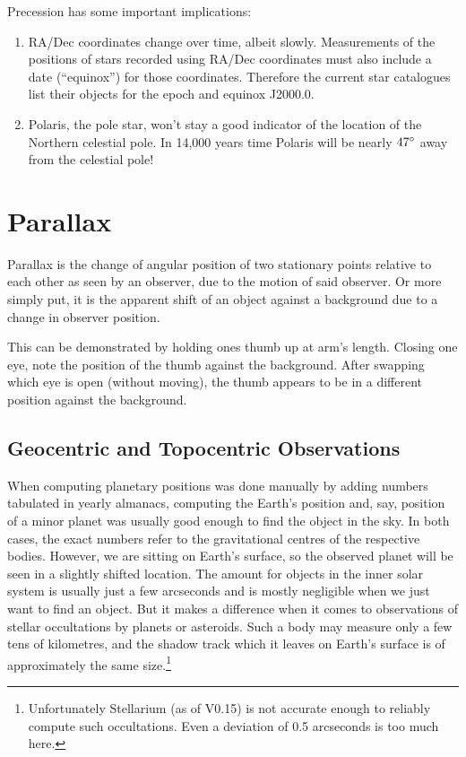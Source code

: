Precession has some important implications:

\begin{enumerate}
\item RA/Dec coordinates change over time, albeit slowly. Measurements
  of the positions of stars recorded using RA/Dec coordinates must
  also include a date (``equinox'') for those coordinates. Therefore
  the current star catalogues list their objects for the epoch and
  equinox J2000.0.
\item
  Polaris, the pole star, won't stay a good indicator of the location of
  the Northern celestial pole. In 14,000 years time Polaris will be
  nearly $47\degree$ away from the celestial pole!
\end{enumerate}


\section{Parallax}
\label{sec:Concepts:Parallax}


Parallax is the change of angular position of two stationary points
relative to each other as seen by an observer, due to the motion of said
observer. Or more simply put, it is the apparent shift of an object
against a background due to a change in observer position.

This can be demonstrated by holding ones thumb up at arm's length.
Closing one eye, note the position of the thumb against the background.
After swapping which eye is open (without moving), the thumb appears to
be in a different position against the background.

\subsection{Geocentric and Topocentric Observations}
\label{sec:Concepts:Topocentric}


When computing planetary positions was done manually by adding numbers
tabulated in yearly almanacs, computing the Earth's position and, say,
position of a minor planet was usually good enough to find the object
in the sky. In both cases, the exact numbers refer to the
gravitational centres of the respective bodies. However, we are
sitting on Earth's surface, so the observed planet will be seen in a
slightly shifted location. The amount for objects in the inner solar
system is usually just a few arcseconds and is mostly negligible when we
just want to find an object. But it makes a difference when it comes
to observations of stellar occultations by planets or asteroids. Such
a body may measure only a few tens of kilometres, and the shadow track
which it leaves on Earth's surface is of approximately the same
size.\footnote{Unfortunately Stellarium (as of V0.15) is not accurate
  enough to reliably compute such occultations. Even a deviation of
  0.5 arcseconds is too much here.}

